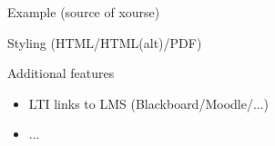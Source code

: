 \begin{frame}{Example (source of xourse)}
  
  \begin{center}
  
  \end{center}
  
\end{frame}


\begin{frame}[t]{Styling (HTML/HTML(alt)/PDF)}
  
\begin{center}

\end{center}

\end{frame}


\begin{frame}{Additional features}

  \begin{itemize}
  \item LTI links to LMS (Blackboard/Moodle/...)
  \item ...
  \end{itemize}

\end{frame}


